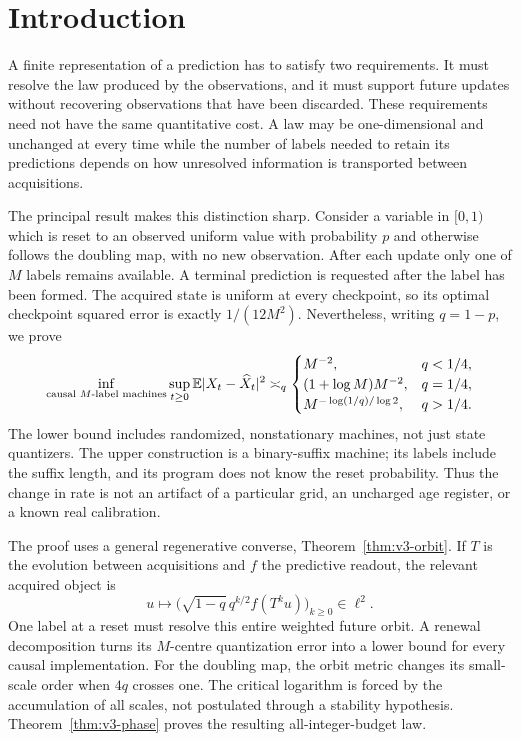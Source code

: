 \section{Introduction}\label{sec:v3-introduction}
A finite representation of a prediction has to satisfy two requirements.
It must resolve the law produced by the observations, and it must support
future updates without recovering observations that have been discarded.
These requirements need not have the same quantitative cost. A law may be
one-dimensional and unchanged at every time while the number of labels
needed to retain its predictions depends on how unresolved information
is transported between acquisitions.

The principal result makes this distinction sharp. Consider a variable
in $[0,1)$ which is reset to an observed uniform value with probability
$p$ and otherwise follows the doubling map, with no new observation.
After each update only one of $M$ labels remains available. A terminal
prediction is requested after the label has been formed. The acquired
state is uniform at every checkpoint, so its optimal checkpoint squared
error is exactly $1/(12M^2)$. Nevertheless, writing $q=1-p$, we prove
\[
 \inf_{\text{causal $M$-label machines}}\sup_{t\ge0}
       \mathbb E|X_t-\widehat X_t|^2
 \asymp_q
 \begin{cases}
 M^{-2},&q<1/4,\\
 (1+\log M)M^{-2},&q=1/4,\\
 M^{-\log(1/q)/\log2},&q>1/4.
 \end{cases}
\]
The lower bound includes randomized, nonstationary machines, not just
state quantizers. The upper construction is a binary-suffix machine;
its labels include the suffix length, and its program does not know the
reset probability. Thus the change in rate is not an artifact of a
particular grid, an uncharged age register, or a known real calibration.

The proof uses a general regenerative converse,
Theorem~\ref{thm:v3-orbit}. If $T$ is the evolution between acquisitions
and $f$ the predictive readout, the relevant acquired object is
\[
 u\longmapsto
 \bigl(\sqrt{1-q}\,q^{k/2}f(T^ku)\bigr)_{k\ge0}\in\ell^2.
\]
One label at a reset must resolve this entire weighted future orbit.
A renewal decomposition turns its $M$-centre quantization error into a
lower bound for every causal implementation. For the doubling map, the
orbit metric changes its small-scale order when $4q$ crosses one. The
critical logarithm is forced by the accumulation of all scales, not
postulated through a stability hypothesis. Theorem~\ref{thm:v3-phase}
proves the resulting all-integer-budget law.

